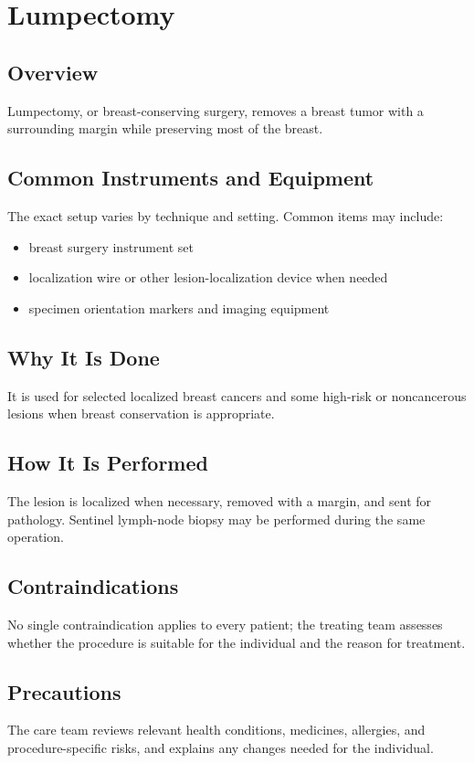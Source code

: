 \chapter{Lumpectomy}
\section*{Overview}
Lumpectomy, or breast-conserving surgery, removes a breast tumor with a surrounding margin while preserving most of the breast.
\section*{Common Instruments and Equipment}
The exact setup varies by technique and setting. Common items may include:
\begin{itemize}[nosep,leftmargin=*]
  \item breast surgery instrument set
  \item localization wire or other lesion-localization device when needed
  \item specimen orientation markers and imaging equipment
\end{itemize}

\section*{Why It Is Done}
It is used for selected localized breast cancers and some high-risk or noncancerous lesions when breast conservation is appropriate.
\section*{How It Is Performed}
The lesion is localized when necessary, removed with a margin, and sent for pathology. Sentinel lymph-node biopsy may be performed during the same operation.
\section*{Contraindications}
No single contraindication applies to every patient; the treating team assesses whether the procedure is suitable for the individual and the reason for treatment.

\section*{Precautions}
The care team reviews relevant health conditions, medicines, allergies, and procedure-specific risks, and explains any changes needed for the individual.

